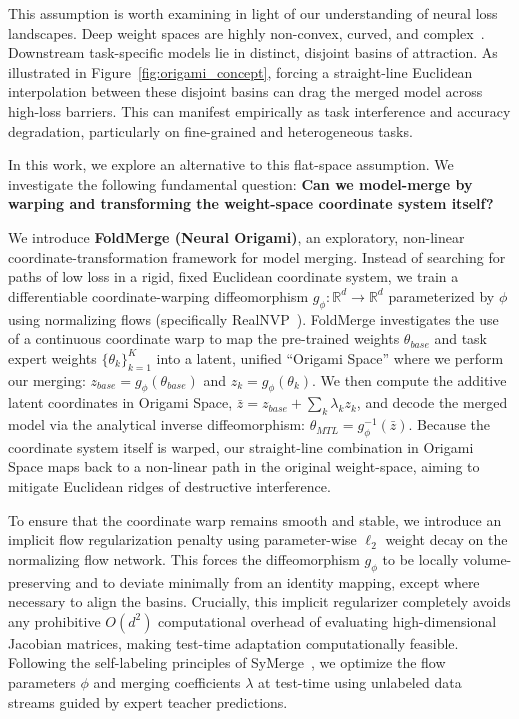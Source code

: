 This assumption is worth examining in light of our understanding of neural loss landscapes. 
Deep weight spaces are highly non-convex, curved, and complex~\cite{garipov2018loss, draxler2018essentially}. 
Downstream task-specific models lie in distinct, disjoint basins of attraction. 
As illustrated in Figure~\ref{fig:origami_concept}, forcing a straight-line Euclidean interpolation between these disjoint basins can drag the merged model across high-loss barriers. 
This can manifest empirically as task interference and accuracy degradation, particularly on fine-grained and heterogeneous tasks.

In this work, we explore an alternative to this flat-space assumption. 
We investigate the following fundamental question: \textbf{Can we model-merge by warping and transforming the weight-space coordinate system itself?}

We introduce \textbf{FoldMerge (Neural Origami)}, an exploratory, non-linear coordinate-transformation framework for model merging. 
Instead of searching for paths of low loss in a rigid, fixed Euclidean coordinate system, we train a differentiable coordinate-warping diffeomorphism $g_\phi: \mathbb{R}^d \to \mathbb{R}^d$ parameterized by $\phi$ using normalizing flows (specifically RealNVP~\cite{dinh2016density}). 
FoldMerge investigates the use of a continuous coordinate warp to map the pre-trained weights $\theta_{base}$ and task expert weights $\{ \theta_k \}_{k=1}^K$ into a latent, unified ``Origami Space'' where we perform our merging: $z_{base} = g_\phi(\theta_{base})$ and $z_k = g_\phi(\theta_k)$. 
We then compute the additive latent coordinates in Origami Space, $\bar{z} = z_{base} + \sum_k \lambda_k z_k$, and decode the merged model via the analytical inverse diffeomorphism: $\theta_{MTL} = g_\phi^{-1}(\bar{z})$. 
Because the coordinate system itself is warped, our straight-line combination in Origami Space maps back to a non-linear path in the original weight-space, aiming to mitigate Euclidean ridges of destructive interference.

To ensure that the coordinate warp remains smooth and stable, we introduce an implicit flow regularization penalty using parameter-wise $\ell_2$ weight decay on the normalizing flow network. 
This forces the diffeomorphism $g_\phi$ to be locally volume-preserving and to deviate minimally from an identity mapping, except where necessary to align the basins. 
Crucially, this implicit regularizer completely avoids any prohibitive $O(d^2)$ computational overhead of evaluating high-dimensional Jacobian matrices, making test-time adaptation computationally feasible. 
Following the self-labeling principles of SyMerge~\cite{jung2025symerge}, we optimize the flow parameters $\phi$ and merging coefficients $\lambda$ at test-time using unlabeled data streams guided by expert teacher predictions.

